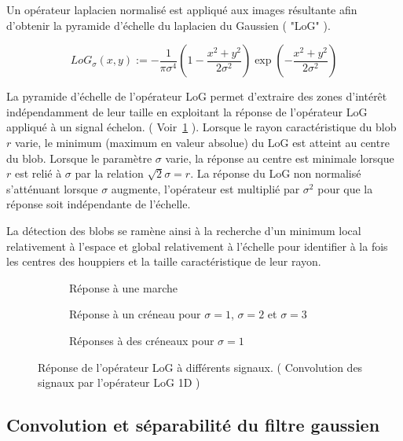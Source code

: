 \documentclass{article}
\begin{document}
	Un opérateur laplacien normalisé est appliqué aux images résultante afin d'obtenir la pyramide d'échelle du laplacien du Gaussien ( "LoG" ). 

	\[{LoG}_{\sigma}(x,y):=-\frac{1}{\pi\sigma^{4}}(1-\frac{x^{2}+y^{2}}{2\sigma^{2}})\exp(-\frac{x^{2}+y^{2}}{2\sigma^{2}})\] 

	La pyramide d'échelle de l'opérateur LoG permet d'extraire des zones d'intérêt indépendamment de leur taille en exploitant la réponse de l'opérateur LoG appliqué à un signal échelon. ( Voir~\ref{fig:graph} ). Lorsque le rayon caractéristique du blob $r$ varie, le minimum (maximum en valeur absolue) du LoG est atteint au centre du blob. Lorsque le paramètre $\sigma$ varie, la réponse au centre est minimale lorsque $r$ est relié à $\sigma$ par la relation $\sqrt{2}\sigma=r$. La réponse du LoG non normalisé s'atténuant lorsque $\sigma$ augmente, l'opérateur est multiplié par $\sigma^{2}$ pour que la réponse soit indépendante de l'échelle.

	La détection des blobs se ramène ainsi à la recherche d'un minimum local relativement à l'espace et global relativement à l'échelle pour identifier à la fois les centres des houppiers et la taille caractéristique de leur rayon. 

	
\begin{figure}[h]
	\begin{subfigure}{.5\textwidth}
		\scalebox{0.3}{}
		\caption{Réponse à une marche}
	\end{subfigure}
	\begin{subfigure}{.5\textwidth}
		\scalebox{0.3}{}
		\caption{Réponse à un créneau pour $\sigma=1$, $\sigma=2$ et $\sigma=3$ }
	\end{subfigure}
	\begin{subfigure}{.5\textwidth}
		\scalebox{0.3}{}
		\caption{Réponses à des créneaux pour $\sigma=1$}
	\end{subfigure}
	\caption{Réponse de l'opérateur LoG à différents signaux. ( Convolution des signaux par l'opérateur LoG 1D )}
	\label{fig:graph}
\end{figure}


	\subsection{Convolution et séparabilité du filtre gaussien}
\end{document}
